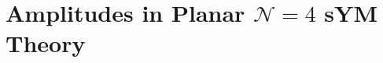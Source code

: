 \documentclass[11pt]{article}
\begin{document}




\section{Amplitudes in Planar $\mathcal{N}=4$ sYM Theory}
\label{sec:amplitudes_review}
\end{document}
